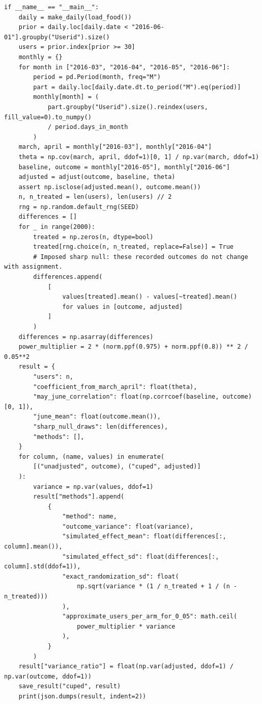 \begin{Verbatim}[breaklines,breakanywhere,fontsize=\small]
if __name__ == "__main__":
    daily = make_daily(load_food())
    prior = daily.loc[daily.date < "2016-06-01"].groupby("Userid").size()
    users = prior.index[prior >= 30]
    monthly = {}
    for month in ["2016-03", "2016-04", "2016-05", "2016-06"]:
        period = pd.Period(month, freq="M")
        part = daily.loc[daily.date.dt.to_period("M").eq(period)]
        monthly[month] = (
            part.groupby("Userid").size().reindex(users, fill_value=0).to_numpy()
            / period.days_in_month
        )
    march, april = monthly["2016-03"], monthly["2016-04"]
    theta = np.cov(march, april, ddof=1)[0, 1] / np.var(march, ddof=1)
    baseline, outcome = monthly["2016-05"], monthly["2016-06"]
    adjusted = adjust(outcome, baseline, theta)
    assert np.isclose(adjusted.mean(), outcome.mean())
    n, n_treated = len(users), len(users) // 2
    rng = np.random.default_rng(SEED)
    differences = []
    for _ in range(2000):
        treated = np.zeros(n, dtype=bool)
        treated[rng.choice(n, n_treated, replace=False)] = True
        # Imposed sharp null: these recorded outcomes do not change with assignment.
        differences.append(
            [
                values[treated].mean() - values[~treated].mean()
                for values in [outcome, adjusted]
            ]
        )
    differences = np.asarray(differences)
    power_multiplier = 2 * (norm.ppf(0.975) + norm.ppf(0.8)) ** 2 / 0.05**2
    result = {
        "users": n,
        "coefficient_from_march_april": float(theta),
        "may_june_correlation": float(np.corrcoef(baseline, outcome)[0, 1]),
        "june_mean": float(outcome.mean()),
        "sharp_null_draws": len(differences),
        "methods": [],
    }
    for column, (name, values) in enumerate(
        [("unadjusted", outcome), ("cuped", adjusted)]
    ):
        variance = np.var(values, ddof=1)
        result["methods"].append(
            {
                "method": name,
                "outcome_variance": float(variance),
                "simulated_effect_mean": float(differences[:, column].mean()),
                "simulated_effect_sd": float(differences[:, column].std(ddof=1)),
                "exact_randomization_sd": float(
                    np.sqrt(variance * (1 / n_treated + 1 / (n - n_treated)))
                ),
                "approximate_users_per_arm_for_0_05": math.ceil(
                    power_multiplier * variance
                ),
            }
        )
    result["variance_ratio"] = float(np.var(adjusted, ddof=1) / np.var(outcome, ddof=1))
    save_result("cuped", result)
    print(json.dumps(result, indent=2))
\end{Verbatim}

